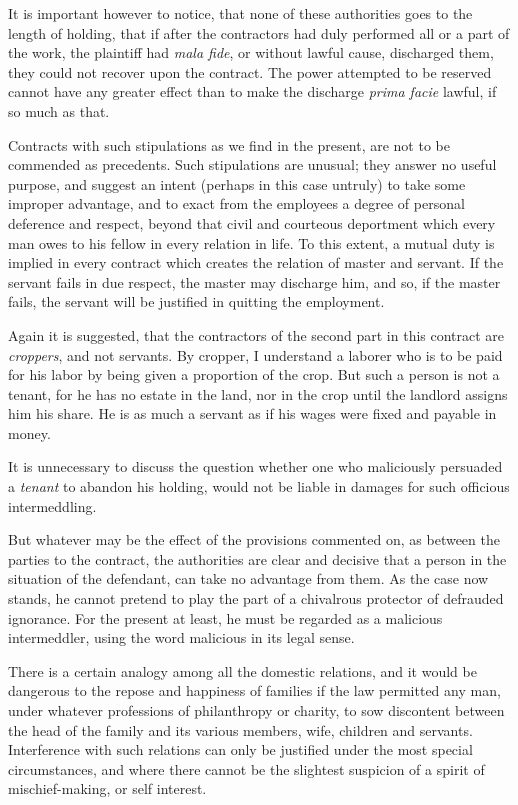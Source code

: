 \documentclass[
  letterpaper,
  11pt,
  DIV=9,
  openright]{scrbook}
\begin{document}
It is important however to notice, that none of these authorities goes
to the length of holding, that if after the contractors had duly
performed all or a part of the work, the plaintiff had \emph{mala fide},
or without lawful cause, discharged them, they could not recover upon
the contract. The power attempted to be reserved cannot have any greater
effect than to make the discharge \emph{prima facie} lawful, if so much
as that.

Contracts with such stipulations as we find in the present, are not to
be commended as precedents. Such stipulations are unusual; they answer
no useful purpose, and suggest an intent (perhaps in this case untruly)
to take some improper advantage, and to exact from the employees a
degree of personal deference and respect, beyond that civil and
courteous deportment which every man owes to his fellow in every
relation in life. To this extent, a mutual duty is implied in every
contract which creates the relation of master and servant. If the
servant fails in due respect, the master may discharge him, and so, if
the master fails, the servant will be justified in quitting the
employment.

Again it is suggested, that the contractors of the second part in this
contract are \emph{croppers}, and not servants. By cropper, I understand
a laborer who is to be paid for his labor by being given a proportion of
the crop. But such a person is not a tenant, for he has no estate in the
land, nor in the crop until the landlord assigns him his share. He is as
much a servant as if his wages were fixed and payable in money.

It is unnecessary to discuss the question whether one who maliciously
persuaded a \emph{tenant} to abandon his holding, would not be liable in
damages for such officious intermeddling.

But whatever may be the effect of the provisions commented on, as
between the parties to the contract, the authorities are clear and
decisive that a person in the situation of the defendant, can take no
advantage from them. As the case now stands, he cannot pretend to play
the part of a chivalrous protector of defrauded ignorance. For the
present at least, he must be regarded as a malicious intermeddler, using
the word malicious in its legal sense.

There is a certain analogy among all the domestic relations, and it
would be dangerous to the repose and happiness of families if the law
permitted any man, under whatever professions of philanthropy or
charity, to sow discontent between the head of the family and its
various members, wife, children and servants. Interference with such
relations can only be justified under the most special circumstances,
and where there cannot be the slightest suspicion of a spirit of
mischief-making, or self interest.
\end{document}
